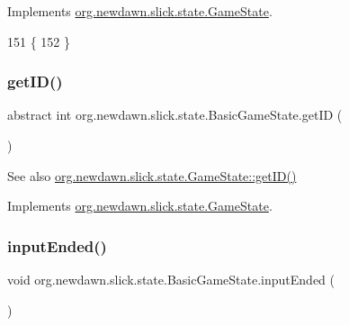 Implements \mbox{\hyperlink{interfaceorg_1_1newdawn_1_1slick_1_1state_1_1_game_state_ad5fc28eca9bed5ca50fffa9adf138884}{org.\+newdawn.\+slick.\+state.\+Game\+State}}.


\begin{DoxyCode}
151                                                                                           \{
152     \}
\end{DoxyCode}
\mbox{\label{classorg_1_1newdawn_1_1slick_1_1state_1_1_basic_game_state_a781ce2b3d6dd9b9853adb011f5e75cf7}} 
\subsubsection{\texorpdfstring{get\+I\+D()}{getID()}}
{\footnotesize\ttfamily abstract int org.\+newdawn.\+slick.\+state.\+Basic\+Game\+State.\+get\+ID (\begin{DoxyParamCaption}{ }\end{DoxyParamCaption})\hspace{0.3cm}{\ttfamily [abstract]}}

\begin{DoxySeeAlso}{See also}
\mbox{\hyperlink{interfaceorg_1_1newdawn_1_1slick_1_1state_1_1_game_state_a54f2bc6a91feaf0614a5ef19f1d03313}{org.\+newdawn.\+slick.\+state.\+Game\+State\+::get\+I\+D()}} 
\end{DoxySeeAlso}


Implements \mbox{\hyperlink{interfaceorg_1_1newdawn_1_1slick_1_1state_1_1_game_state_a54f2bc6a91feaf0614a5ef19f1d03313}{org.\+newdawn.\+slick.\+state.\+Game\+State}}.

\mbox{\label{classorg_1_1newdawn_1_1slick_1_1state_1_1_basic_game_state_a7bbd6fe017193ba107713e0e77c668f1}} 
\subsubsection{\texorpdfstring{input\+Ended()}{inputEnded()}}
{\footnotesize\ttfamily void org.\+newdawn.\+slick.\+state.\+Basic\+Game\+State.\+input\+Ended (\begin{DoxyParamCaption}{ }\end{DoxyParamCaption})\hspace{0.3cm}{\ttfamily [inline]}}

